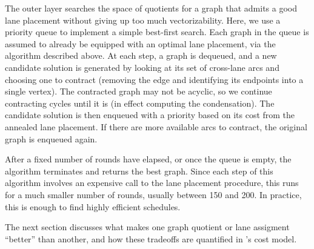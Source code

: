 The outer layer searches the space of quotients for a graph that admits a good lane placement without giving up too much vectorizability.
Here, we use a priority queue to implement a simple best-first search.
Each graph in the queue is assumed to already be equipped with an optimal lane placement, via the algorithm described above.
At each step, a graph is dequeued, and a new candidate solution is generated by looking at its set of cross-lane arcs and choosing one to contract (removing the edge and identifying its endpoints into a single vertex).
The contracted graph may not be acyclic, so we continue contracting cycles until it is (in effect computing the condensation). %
The candidate solution is then enqueued with a priority based on its cost from the annealed lane placement.
If there are more available arcs to contract, the original graph is enqueued again.

After a fixed number of rounds have elapsed, or once the queue is empty, the algorithm terminates and returns the best graph.
Since each step of this algorithm involves an expensive call to the lane placement procedure, this runs for a much smaller number of rounds, usually between 150 and 200.
In practice, this is enough to find highly efficient schedules.

The next section discusses what makes one graph quotient or lane assigment ``better'' than another, and how these tradeoffs are quantified in \system's cost model.

